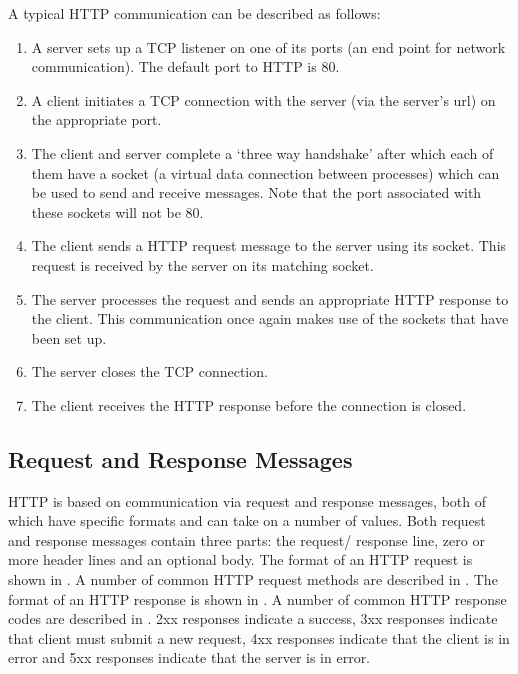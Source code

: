 \documentclass[10pt,twocolumn]{witseiepaper}
\begin{document}
A typical HTTP communication can be described as follows: 
\begin{enumerate}
	\item A server sets up a TCP listener on one of its ports (an end point for network communication). The default port to HTTP is 80. 
	\item A client initiates a TCP connection with the server (via the server's url) on the appropriate port. 
	\item The client and server complete a `three way handshake' after which each of them have a socket (a virtual data connection between processes) which can be used to send and receive messages. Note that the port associated with these sockets will not be 80.
	\item The client sends a HTTP request message to the server using its socket. This request is received by the server on its matching socket.
	\item The server processes the request and sends an appropriate HTTP response to the client. This communication once again makes use of the sockets that have been set up. 
	\item The server closes the TCP connection.
	\item The client receives the HTTP response before the connection is closed.
\end{enumerate}

	\subsection{Request and Response Messages} \label{formats}

	HTTP is based on communication via request and response messages, both of which have specific formats and can take on a number of values. Both request and response messages contain three parts: the request/ response line, zero or more header lines and an optional body. The format of an HTTP request is shown in . A number of common HTTP request methods are described in . The format of an HTTP response is shown in . A number of common HTTP response codes are described in . 2xx responses indicate a success, 3xx responses indicate that client must submit a new request, 4xx responses indicate that the client is in error and 5xx responses indicate that the server is in error.
\end{document}
